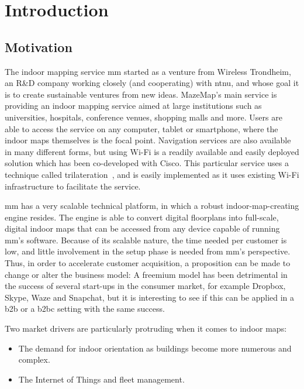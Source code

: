 \chapter{Introduction}
\section{Motivation}
The indoor mapping service \gls{mm} started as a venture from Wireless Trondheim, an R\&D company working closely (and cooperating) with \gls{ntnu}, and whose goal it is to create sustainable ventures from new ideas. MazeMap's main service is providing an indoor mapping service aimed at large institutions such as universities, hospitals, conference venues, shopping malls and more. Users are able to access the service on any computer, tablet or smartphone, where the indoor maps themselves is the focal point. Navigation services are also available in many different forms, but using Wi-Fi is a readily available and easily deployed solution which has been co-developed with Cisco. This particular service uses a technique called trilateration~\cite{BiczokMJK14}, and is easily implemented as it uses existing Wi-Fi infrastructure to facilitate the service.


\gls{mm} has a very scalable technical platform, in which a robust indoor-map-creating engine resides. The engine is able to convert digital floorplans into full-scale, digital indoor maps that can be accessed from any device capable of running \gls{mm}'s software. Because of its scalable nature, the time needed per customer is low, and little involvement in the setup phase is needed from \gls{mm}'s perspective. Thus, in order to accelerate customer acquisition, a proposition can be made to change or alter the business model: A freemium model has been detrimental in the success of several start-ups in the consumer market, for example Dropbox, Skype, Waze and Snapchat, but it is interesting to see if this can be applied in a \gls{b2b} or a \gls{b2bc} setting with the same success.
\newpage

Two market drivers are particularly protruding when it comes to indoor maps:

\begin{itemize}
    \item The demand for indoor orientation as buildings become more numerous and complex.
    \item The Internet of Things and fleet management.
\end{itemize}

